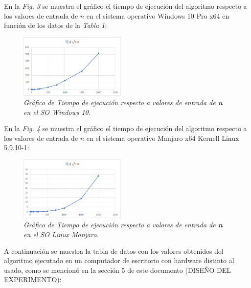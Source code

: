 \documentclass[11pt, twocolumn]{llncs}
\begin{document}
En la \textit{Fig. 3} se muestra el gráfico el tiempo de ejecución del algoritmo respecto a los valores de entrada de $n$ en el sistema operativo Windows 10 Pro x64 en función de los datos de la \textit{Tabla 1}:

\begin{figure}[H]
\caption{\textit{\label{fig:grafico1}Gráfico de Tiempo de ejecución respecto a valores de entrada de \textbf{n} en el SO Windows 10.}}
\centering
\includegraphics[width=0.47\textwidth]{grafico_1.png}
\end{figure}

En la \textit{Fig. 4} se muestra el gráfico el tiempo de ejecución del algoritmo respecto a los valores de entrada de $n$ en el sistema operativo Manjaro x64 Kernell Linux 5.9.10-1:

\begin{figure}[H]
\caption{\textit{\label{fig:grafico2}Gráfico de Tiempo de ejecución respecto a valores de entrada de \textbf{n} en el SO Linux Manjaro.}}
\centering
\includegraphics[width=0.47\textwidth]{grafico_2.png}
\end{figure}

A continuación se muestra la tabla de datos con los valores obtenidos del algoritmo ejecutado en un computador de escritorio con hardware distinto al usado, como se mencionó en la sección 5 de este documento (DISEÑO DEL EXPERIMENTO):
\end{document}
